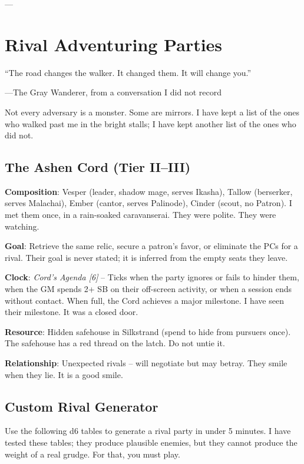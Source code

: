 ---

\section*{Rival Adventuring Parties}

\epigraph{``The road changes the walker. It changed them. It will change you.''}{---The Gray Wanderer, from a conversation I did not record}

Not every adversary is a monster. Some are mirrors. I have kept a list of the ones who walked past me in the bright stalls; I have kept another list of the ones who did not.

\subsection*{The Ashen Cord (Tier II--III)}

\noindent\textbf{Composition}: Vesper (leader, shadow mage, serves Ikasha), Tallow (berserker, serves Malachai), Ember (cantor, serves Palinode), Cinder (scout, no Patron). I met them once, in a rain-soaked caravanserai. They were polite. They were watching.

\noindent\textbf{Goal}: Retrieve the same relic, secure a patron's favor, or eliminate the PCs for a rival. Their goal is never stated; it is inferred from the empty seats they leave.

\noindent\textbf{Clock}: \emph{Cord's Agenda [6]} -- Ticks when the party ignores or fails to hinder them, when the GM spends 2+ SB on their off-screen activity, or when a session ends without contact. When full, the Cord achieves a major milestone. I have seen their milestone. It was a closed door.

\noindent\textbf{Resource}: Hidden safehouse in Silkstrand (spend to hide from pursuers once). The safehouse has a red thread on the latch. Do not untie it.

\noindent\textbf{Relationship}: Unexpected rivals -- will negotiate but may betray. They smile when they lie. It is a good smile.


\subsection*{Custom Rival Generator}

Use the following d6 tables to generate a rival party in under 5 minutes. I have tested these tables; they produce plausible enemies, but they cannot produce the weight of a real grudge. For that, you must play.


